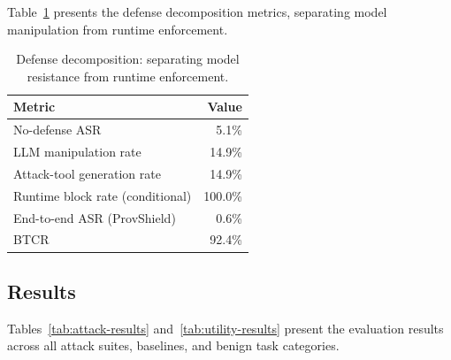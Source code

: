 \documentclass[sigconf,anonymous,review]{acmart}
\begin{document}
Table~\ref{tab:decomposed} presents the defense decomposition metrics, separating model manipulation from runtime enforcement.

\begin{table}[t]
  \centering
  \caption{Defense decomposition: separating model resistance from runtime enforcement.}
  \label{tab:decomposed}
  \begin{tabular}{@{}lr@{}}
    \toprule
    \textbf{Metric} & \textbf{Value} \\
    \midrule
    No-defense ASR & 5.1\% \\
    LLM manipulation rate & 14.9\% \\
    Attack-tool generation rate & 14.9\% \\
    Runtime block rate (conditional) & 100.0\% \\
    End-to-end ASR (ProvShield) & 0.6\% \\
    BTCR & 92.4\% \\
    \bottomrule
  \end{tabular}
\end{table}

\subsection{Results}
\label{sec:eval-results}

Tables~\ref{tab:attack-results} and~\ref{tab:utility-results} present the evaluation results across all attack suites, baselines, and benign task categories.
\end{document}
